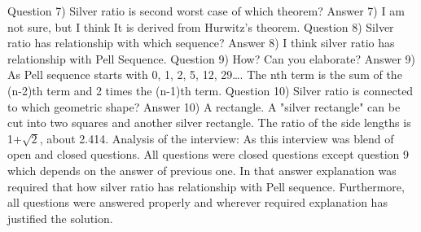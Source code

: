 \documentclass[12pt]{article}
\begin{document}
\newline
Question 7) Silver ratio is second worst case of which theorem?
\newline
Answer 7) I am not sure, but I think It is derived from Hurwitz’s theorem.
\newline
\newline
Question 8) Silver ratio has relationship with which sequence?
\newline
Answer 8) I think silver ratio has relationship with Pell Sequence.
\newline
\newline
Question 9) How? Can you elaborate?
\newline
Answer 9) As Pell sequence starts with 0, 1, 2, 5, 12, 29…. The nth term is the sum of the (n-2)th term and 2 times the (n-1)th term.
\newline
\newline
Question 10) Silver ratio is connected to which geometric shape?
\newline
Answer 10) A rectangle. A "silver rectangle" can be cut into two squares and another silver rectangle. The ratio of the side lengths is 1+$\sqrt{2}$, about 2.414.
\newline
\newline
Analysis of the interview:
\newline
As this interview was blend of open and closed questions. All questions were closed questions except question 9 which depends on the answer of previous one. In that answer explanation was required that how silver ratio has relationship with Pell sequence.
Furthermore, all questions were answered properly and wherever required explanation has justified the solution.
\end{document}
